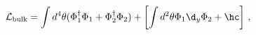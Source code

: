 \begin{equation}
\mathcal{L}_{\mathrm{bulk}}=\int d^4 \theta (\Phi^\dagger_1 \Phi_1 +
\Phi^\dagger_2 \Phi_2) + \left[ \int d^2 \theta \Phi_1 \d_y \Phi_2 + 
\hc\right] \, ,
\end{equation}

